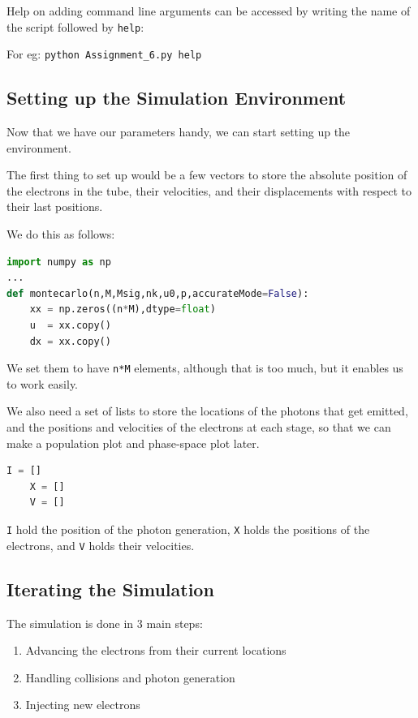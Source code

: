 \documentclass[12pt]{article}
\begin{document}
Help on adding command line arguments can be accessed by writing the name of the script followed by \texttt{help}:

\begin{center}
For eg: \texttt{python Assignment\_6.py help}
\end{center}
\pagebreak
\subsection{Setting up the Simulation Environment}
Now that we have our parameters handy, we can start setting up the environment.

The first thing to set up would be a few vectors to store the absolute position of the electrons in the tube, their velocities, and their displacements with respect to their last positions.

We do this as follows:
\begin{lstlisting}[language=Python]
import numpy as np
...
def montecarlo(n,M,Msig,nk,u0,p,accurateMode=False):
    xx = np.zeros((n*M),dtype=float)
    u  = xx.copy()
    dx = xx.copy()
\end{lstlisting}

We set them to have \texttt{n*M} elements, although that is too much, but it enables us to work easily.

We also need a set of lists to store the locations of the photons that get emitted, and the positions and velocities of the electrons at each stage, so that we can make a population plot and phase-space plot later.

\begin{lstlisting}[language=Python]
    I = []
    X = []
    V = []
\end{lstlisting}

\texttt{I} hold the position of the photon generation, \texttt{X} holds the positions of the electrons, and \texttt{V} holds their velocities.

\subsection{Iterating the Simulation}
The simulation is done in 3 main steps:

\begin{enumerate}
    \item Advancing the electrons from their current locations
    \item Handling collisions and photon generation
    \item Injecting new electrons
\end{enumerate}
\end{document}
